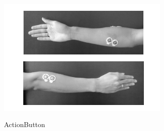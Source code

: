 \begin{figure}[hp!]
\begin{center}
    \includegraphics[width=0.75\textwidth]{imaxes/electrodos.png}
    \caption{ActionButton}
    
    \vspace{1cm}

    \label{ActionButton}
  \end{center}
\end{figure}



